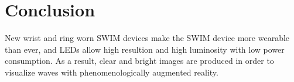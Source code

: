 \documentclass{sigchi-ext}
\begin{document}

\section{Conclusion}
New wrist and ring worn SWIM devices make the SWIM device more wearable than ever, and LEDs allow high resultion and high luminosity with low power consumption. As a result, clear and bright images are produced in order to visualize waves with phenomenologically augmented reality.

\balance{}



\end{document}

